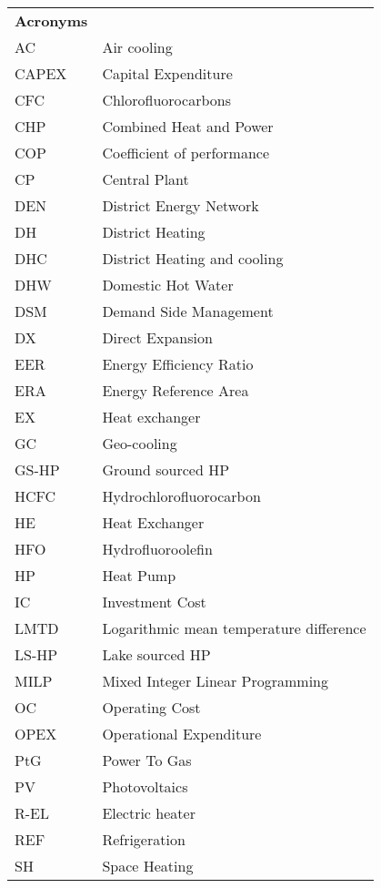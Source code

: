 \begin{table}[thp!]
	\centering
	\begin{tabular}{ll}
		\textbf{Acronyms} & \\
		AC & Air cooling \\
		CAPEX & Capital Expenditure \\
		CFC & Chlorofluorocarbons \\
		CHP & Combined Heat and Power \\
		COP & Coefficient of performance \\
		CP & Central Plant \\
		DEN & District Energy Network \\
		DH & District Heating \\
		DHC & District Heating and cooling \\
		DHW & Domestic Hot Water \\
		DSM & Demand Side Management \\
		DX & Direct Expansion \\
		EER & Energy Efficiency Ratio \\
		ERA & Energy Reference Area \\
		EX & Heat exchanger \\
		GC & Geo-cooling \\
		GS-HP & Ground sourced HP \\
		HCFC & Hydrochlorofluorocarbon \\
		HE & Heat Exchanger \\
		HFO & Hydrofluoroolefin \\
		HP & Heat Pump \\
		IC & Investment Cost \\
		LMTD & Logarithmic mean temperature difference \\
		LS-HP & Lake sourced HP \\
		MILP & Mixed Integer Linear Programming \\
		OC & Operating Cost \\
		OPEX & Operational Expenditure \\
		PtG & Power To Gas \\
		PV & Photovoltaics \\
		R-EL & Electric heater \\
		REF & Refrigeration \\
		SH & Space Heating \\

\end{tabular}
\end{table}
